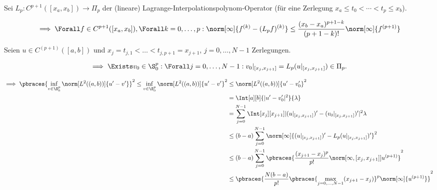 \begin{solution}

Sei $L_p: C^{p+1}([x_a, x_b]) \to \Pi_p$ der (lineare) Lagrange-Interpolationspolynom-Operator (für eine Zerlegung $x_a \leq t_0 < \cdots < t_p \leq x_b$).


\begin{align*}
  \implies
  \Forall f \in C^{p+1}([x_a, x_b]),
  \Forall k = 0, \dots, p:
  \norm[\infty]
  {
    f^{(k)} - (L_p f)^{(k)}
  }
  \leq
  \frac
  {
    (x_b - x_a)^{p+1-k}
  }{
    (p + 1 - k)!
  }
  \norm[\infty]
  {
    f^{(p+1)}
  }
\end{align*}

Seien $u \in C^{(p+1)}([a, b])$ und $x_j = t_{j, 1} < \dots < t_{j, p+1} = x_{j+1}$, $j = 0, \dots, N-1$ Zerlegungen.

\begin{align*}
  \implies
  \Exists v_0 \in \S_0^p:
  \Forall j = 0, \dots, N-1:
  v_0|_{[x_j , x_{j+1}]}
  =
  L_p(u|_{[x_j , x_{j+1}]})
  \in
  \Pi_p.
\end{align*}

\begin{align*}
  \implies
  \pbraces
  {
    \inf_{v \in \S^p_0}
    \norm[L^2((a, b))]{u^\prime - v^\prime}
  }^2
  \leq
  \inf_{v \in \S^p_0}
  \norm[L^2((a, b))]{u^\prime - v^\prime}^2
  & \leq
  \norm[L^2((a, b))]{u^\prime - v_0^\prime}^2 \\
  & =
  \Int[a][b]
  {|u^\prime - v_0^\prime|^2}
  {\lambda} \\
  & =
  \sum_{j=0}^{N-1}
  \Int[x_j][x_{j+1}]
  {
    |
      (u|_{[x_j , x_{j+1}]})^\prime
      -
      (v_0|_{[x_j , x_{j+1}]})^\prime
    |^2
  }
  {\lambda} \\
  & \leq
  (b-a)
  \sum_{j=0}^{N-1}
  \norm[\infty]
  {
    (u|_{[x_j , x_{j+1}]})^\prime
    -
    L_p(u|_{[x_j , x_{j+1}]})^\prime
  }^2 \\
  & \leq
  (b-a)
  \sum_{j=0}^{N-1}
  \pbraces
  {
    \frac
    {
      ({x_{j+1} - x_j})^{p}
    }{p!}
    \norm
    [{\infty, [x_j,x_{j+1}]}]
    {u^{(p+1)}}
  }^2 \\
  & \leq
  \pbraces
  {
    \frac{N (b-a)}{p!}
    \pbraces
    {
      \max_{j=0, \dots, N-1}
      (x_{j+1} - x_j)
    }^{p}
    \norm[\infty]{u^{(p+1)}}
  }^2
\end{align*}

\end{solution}

